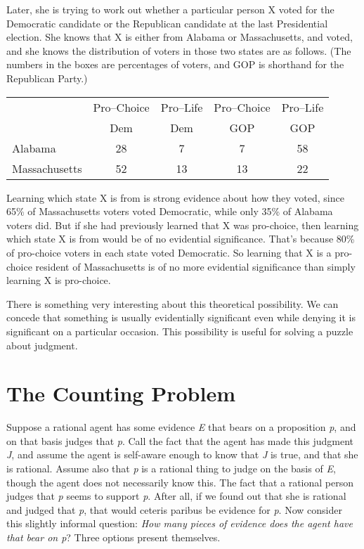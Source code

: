 Later, she is trying to work out whether a particular person X voted for the Democratic candidate or the Republican candidate at the last Presidential election. She knows that X is either from Alabama or Massachusetts, and voted, and she knows the distribution of voters in those two states are as follows. (The numbers in the boxes are percentages of voters, and GOP is shorthand for the Republican Party.)

\begin{table}[htbp]
\begin{minipage}{\linewidth}
\setlength{\tymax}{0.5\linewidth}
\centering
\small
\begin{tabulary}{\textwidth}{@{}lcccc@{}} \toprule
 & Pro--Choice & Pro--Life & Pro--Choice & Pro--Life \\
 & Dem & Dem & GOP & GOP \\
\midrule

 Alabama & 28 & 7 & 7 & 58 \\
 Massachusetts & 52 & 13 & 13 & 22 \\
\bottomrule

\end{tabulary}
\end{minipage}
\end{table}

\noindent  Learning which state X is from is strong evidence about how they voted, since 65\% of Massachusetts voters voted Democratic, while only 35\% of Alabama voters did. But if she had previously learned that X was pro-choice, then learning which state X is from would be of no evidential significance. That's because 80\% of pro-choice voters in each state voted Democratic. So learning that X is a pro-choice resident of Massachusetts is of no more evidential significance than simply learning X is pro-choice.

There is something very interesting about this theoretical possibility. We can concede that something is usually evidentially significant even while denying it is significant on a particular occasion. This possibility is useful for solving a puzzle about judgment.

\section{The Counting Problem}
\label{thecountingproblem}

Suppose a rational agent has some evidence \emph{E} that bears on a proposition \emph{p}, and on that basis judges that \emph{p}. Call the fact that the agent has made this judgment \emph{J}, and assume the agent is self-aware enough to know that \emph{J} is true, and that she is rational. Assume also that \emph{p} is a rational thing to judge on the basis of \emph{E}, though the agent does not necessarily know this. The fact that a rational person judges that \emph{p} seems to support \emph{p}. After all, if we found out that she is rational and judged that \emph{p}, that would ceteris paribus be evidence for \emph{p}. Now consider this slightly informal question: \emph{How many pieces of evidence does the agent have that bear on p}? Three options present themselves.

